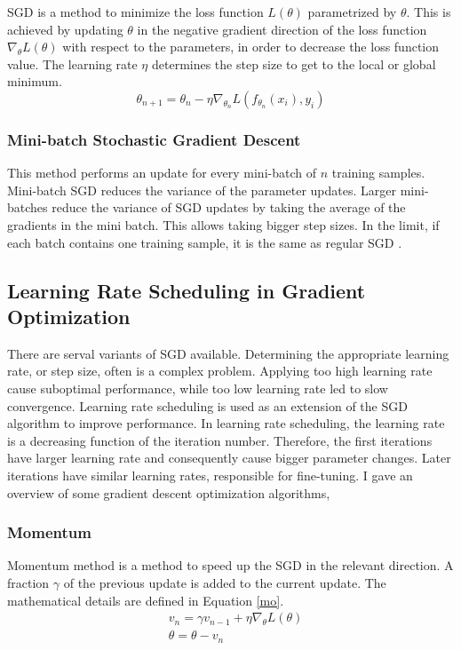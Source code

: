     SGD is a method to minimize the loss function \(L(\theta)\)  parametrized by $\theta$. This is achieved by updating $\theta$ in the negative gradient direction of the loss function $\nabla_{\theta}L(\theta)$ with respect to the parameters, in order to decrease the loss function value. The learning rate $\eta$ determines the step size to get to the local or global minimum. 
    \begin{equation}
        \theta_{n+1} = \theta_{n} - \eta \nabla_{\theta_{n}}L(f_{\theta_{n}}(x_i), y_i)
    \end{equation}

    \subsubsection{Mini-batch Stochastic Gradient Descent}
    This method performs an update for every mini-batch of $n$ training samples. Mini-batch SGD reduces the variance of the parameter updates. Larger mini-batches reduce the variance of SGD updates by taking the average of the gradients in the mini batch. This allows taking bigger step sizes. In the limit, if each batch contains one training sample, it is the same as regular SGD \cite{zhang2015deep}.

    \subsection{Learning Rate Scheduling in Gradient Optimization}
    \label{learning}
    There are serval variants of SGD available. Determining the appropriate learning rate, or step size, often is a complex problem. Applying too high learning rate cause suboptimal performance, while too low learning rate led to slow convergence. Learning rate scheduling is used as an extension of the SGD algorithm to improve performance. In learning rate scheduling, the learning rate is a decreasing function of the iteration number. Therefore, the first iterations have larger learning rate and consequently cause bigger parameter changes. Later iterations have similar learning rates, responsible for fine-tuning. I gave an overview of some gradient descent optimization algorithms,

    \subsubsection{Momentum}
    Momentum method is a method to speed up the SGD in the relevant direction.  A fraction $\gamma$ of the previous update is added to the current update. The mathematical details are defined in Equation \ref{mo}.
    \begin{equation}
        \begin{aligned}
            & v_n = \gamma v_{n-1} + \eta \nabla_{\theta}L(\theta) \\
            & \theta= \theta - v_{n}
        \end{aligned}
        \label{mo}
    \end{equation} 

